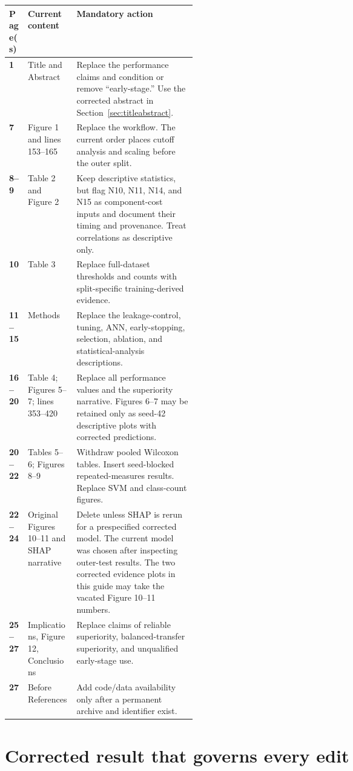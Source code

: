\documentclass[10pt]{article}
\begin{document}
\begin{tabularx}{\linewidth}{>{\bfseries}p{0.10\linewidth}p{0.26\linewidth}X}
\toprule
Page(s) & Current content & Mandatory action \\
\midrule
1 & Title and Abstract & Replace the performance claims and condition or remove ``early-stage.'' Use the corrected abstract in Section~\ref{sec:titleabstract}. \\
7 & Figure 1 and lines 153--165 & Replace the workflow. The current order places cutoff analysis and scaling before the outer split. \\
8--9 & Table 2 and Figure 2 & Keep descriptive statistics, but flag N10, N11, N14, and N15 as component-cost inputs and document their timing and provenance. Treat correlations as descriptive only. \\
10 & Table 3 & Replace full-dataset thresholds and counts with split-specific training-derived evidence. \\
11--15 & Methods & Replace the leakage-control, tuning, ANN, early-stopping, selection, ablation, and statistical-analysis descriptions. \\
16--20 & Table 4; Figures 5--7; lines 353--420 & Replace all performance values and the superiority narrative. Figures 6--7 may be retained only as seed-42 descriptive plots with corrected predictions. \\
20--22 & Tables 5--6; Figures 8--9 & Withdraw pooled Wilcoxon tables. Insert seed-blocked repeated-measures results. Replace SVM and class-count figures. \\
22--24 & Original Figures 10--11 and SHAP narrative & Delete unless SHAP is rerun for a prespecified corrected model. The current model was chosen after inspecting outer-test results. The two corrected evidence plots in this guide may take the vacated Figure 10--11 numbers. \\
25--27 & Implications, Figure 12, Conclusions & Replace claims of reliable superiority, balanced-transfer superiority, and unqualified early-stage use. \\
27 & Before References & Add code/data availability only after a permanent archive and identifier exist. \\
\bottomrule
\end{tabularx}

\section{Corrected result that governs every edit}
\end{document}
